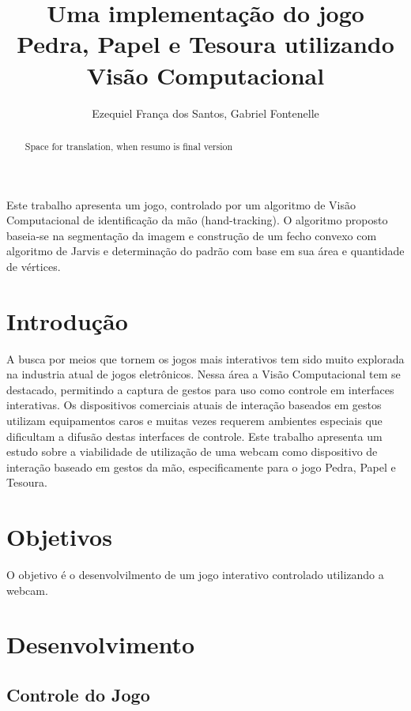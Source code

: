 \documentclass[12pt]{article}
\title{Uma implementação do jogo Pedra, Papel e Tesoura utilizando Visão Computacional}
\author{Ezequiel França dos Santos\inst{1}, Gabriel Fontenelle\inst{1}}
\begin{document}
 
\maketitle

\begin{abstract}
Space for translation, when resumo is final version %
\end{abstract}
     
\begin{resumo} 
Este trabalho apresenta um jogo, controlado por um algoritmo de Visão Computacional de identificação da mão (hand-tracking). O algoritmo proposto baseia-se na segmentação da imagem e construção de um fecho convexo com algoritmo de Jarvis e determinação do padrão com base em sua área e quantidade de vértices.
\end{resumo}


\section{Introdução}

A busca por meios que tornem os jogos mais interativos tem sido muito explorada na industria atual de jogos eletrônicos. Nessa área a Visão Computacional tem se destacado, permitindo a captura de gestos para uso como controle em interfaces interativas. Os dispositivos comerciais atuais de interação baseados em gestos utilizam equipamentos caros e
muitas vezes requerem ambientes especiais que dificultam a difusão destas interfaces de controle.
Este trabalho apresenta um estudo sobre a viabilidade de utilização de uma webcam como dispositivo de interação baseado em gestos da mão, especificamente para o jogo Pedra, Papel e Tesoura.


\section{Objetivos}

O objetivo é o desenvolvilmento de um jogo interativo controlado utilizando a webcam. 

\section{Desenvolvimento}


\subsection{Controle do Jogo}
\end{document}
